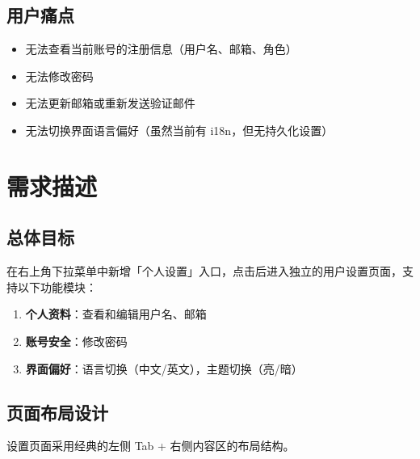 \documentclass[11pt,a4paper]{article}
\begin{document}
\subsection{用户痛点}

\begin{itemize}[nosep]
  \item 无法查看当前账号的注册信息（用户名、邮箱、角色）
  \item 无法修改密码
  \item 无法更新邮箱或重新发送验证邮件
  \item 无法切换界面语言偏好（虽然当前有 i18n，但无持久化设置）
\end{itemize}

\section{需求描述}

\subsection{总体目标}

在右上角下拉菜单中新增「个人设置」入口，点击后进入独立的用户设置页面，支持以下功能模块：

\begin{enumerate}[nosep]
  \item \textbf{个人资料}：查看和编辑用户名、邮箱
  \item \textbf{账号安全}：修改密码
  \item \textbf{界面偏好}：语言切换（中文/英文），主题切换（亮/暗）
\end{enumerate}

\subsection{页面布局设计}

设置页面采用经典的左侧 Tab + 右侧内容区的布局结构。
\end{document}
